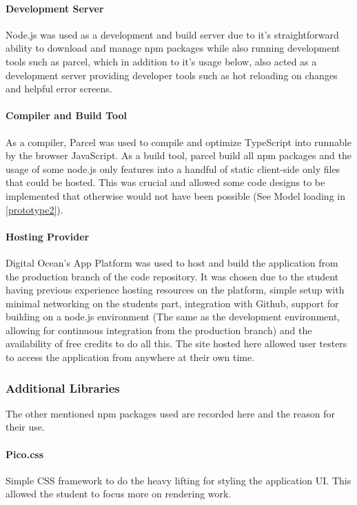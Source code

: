 \paragraph{Development Server}
Node.js was used as a development and build server due to it's straightforward ability to download and manage npm packages while also running development tools such as parcel, which in addition to it's usage below, also acted as a development server providing developer tools such as hot reloading on changes and helpful error screens.

\paragraph{Compiler and Build Tool}
As a compiler, Parcel was used to compile and optimize TypeScript into runnable by the browser JavaScript. As a build tool, parcel build all npm packages and the usage of some node.js only features into a handful of static client-side only files that could be hosted. This was crucial and allowed some code designs to be implemented that otherwise would not have been possible (See Model loading in \ref{prototype2}).

\paragraph{Hosting Provider}
Digital Ocean's App Platform was used to host and build the application from the production branch of the code repository. It was chosen due to the student having previous experience hosting resources on the platform, simple setup with minimal networking on the students part, integration with Github, support for building on a node.js environment (The same as the development environment, allowing for continuous integration from the production branch) and the availability of free credits to do all this. The site hosted here allowed user testers to access the application from anywhere at their own time.

\subsubsection{Additional Libraries}
The other mentioned npm packages used are recorded here and the reason for their use.

\paragraph{Pico.css}
Simple CSS framework to do the heavy lifting for styling the application UI. This allowed the student to focus more on rendering work.

